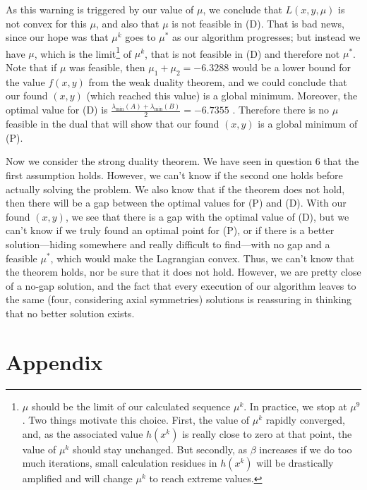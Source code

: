 \documentclass{article}
\begin{document}
As this warning is triggered by our value of $\mu$, we conclude that $L(x, y, \mu)$ is not convex for this $\mu$, and also that $\mu$ is not feasible in (D). That is bad news, since our hope was that $\mu^k$ goes to $\mu^*$ as our algorithm progresses; but instead we have $\mu$, which is the limit\footnote{$\mu$ should be the limit of our calculated sequence $\mu^k$. In practice, we stop at $\mu^9$. Two things motivate this choice. First, the value of $\mu^k$ rapidly converged, and, as the associated value $h(x^k)$ is really close to zero at that point, the value of $\mu^k$ should stay unchanged. But secondly, as $\beta$ increases if we do too much iterations, small calculation residues in $h(x^k)$ will be drastically amplified and will change $\mu^k$ to reach extreme values.}
of $\mu^k$, that is not feasible in (D) and therefore not $\mu^*$. Note that if $\mu$ was feasible, then $\mu_1 + \mu_2 = -6.3288$ would be a lower bound for the value $f(x, y)$ from the weak duality theorem, and we could conclude that our found $(x, y)$ (which reached this value) is a global minimum.
Moreover, the optimal value for (D) is $\frac{\lambda_{\min}(A) + \lambda_{\min}(B)}{2} = -6.7355$ . Therefore there is no $\mu$ feasible in the dual that will show that our found $(x, y)$ is a global minimum of (P).

Now we consider the strong duality theorem. We have seen in question 6 that the first assumption holds. However, we can't know if the second one holds before actually solving the problem. We also know that if the theorem does not hold, then there will be a gap between the optimal values for (P) and (D). With our found $(x, y)$, we see that there is a gap with the optimal value of (D), but we can't know if we truly found an optimal point for (P), or if there is a better solution---hiding somewhere and really difficult to find---with no gap and a feasible $\mu^*$, which would make the Lagrangian convex. Thus, we can't know that the theorem holds, nor be sure that it does not hold. However, we are pretty close of a no-gap solution, and the fact that every execution of our algorithm leaves to the same (four, considering axial symmetries) solutions is reassuring in thinking that no better solution exists.\\

\pagebreak

\section*{Appendix}
\end{document}
